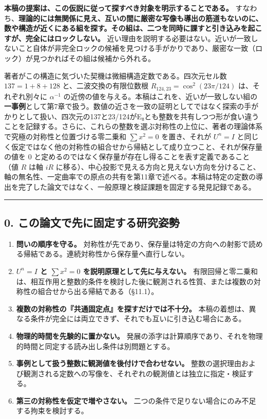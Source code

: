 \documentclass[
  a4paper,
]{ltjsarticle}
\providecommand{\tightlist}{%
  \setlength{\itemsep}{0pt}\setlength{\parskip}{0pt}}
\begin{document}
\textbf{本稿の提案は、この仮説に従って探すべき対象を明示することである。}
すなわち、\textbf{理論的には無関係に見え、互いの間に厳密な写像も導出の筋道もないのに、数や構造が近くにある組を探す。その組は、二つを同時に課すと引き込みを起こすが、完全にはロックしない。}
近い理由を説明する必要はない。近いが一致しないこと自体が非完全ロックの候補を見つける手がかりであり、厳密な一致（ロック）が見つかればその組は候補から外れる。

著者がこの構造に気づいた契機は微細構造定数である。四次元セル数
\(137=1+8+128\) と、二波交換の有限位数根
\(R_{124,23}=\cos^2(23\pi/124)\) は、それぞれ別々に \(\alpha^{-1}\)
の近傍の値を与える。本稿はこれを、近いが一致しない組の\textbf{一事例}として第7章で扱う。数値の近さを一致の証明としてではなく探索の手がかりとして扱い、四次元の137と23/124がE₈とも整数を共有しつつ形が食い違うことを記録する。さらに、これらの整数を選ぶ対称性の上位に、著者の理論体系で究極の対称性と位置づける零二乗和
\(\sum x^2=0\) を置き、それが \(U^n=I\)
と同じく仮定ではなく他の対称性の組合せから帰結として成り立つこと、それが保存量の値を
0 と定めるのではなく保存量が存在し得ることを表す定義であること（値 \(R\)
は軸 \(iR\)
に移る）、中心投影で見える方向と見えない方向を分けること、軸の無名性、一定曲率での原点の共有を第11章で述べる。本稿は特定の定数の導出を完了した論文ではなく、一般原理と検証課題を固定する発見記録である。

\begin{center}\rule{0.5\linewidth}{0.5pt}\end{center}

\subsection{0.
この論文で先に固定する研究姿勢}\label{ux3053ux306eux8ad6ux6587ux3067ux5148ux306bux56faux5b9aux3059ux308bux7814ux7a76ux59ffux52e2}

\begin{enumerate}
\def\labelenumi{\arabic{enumi}.}
\tightlist
\item
  \textbf{問いの順序を守る。}
  対称性が先であり、保存量は特定の方向への射影で読める帰結である。連続対称性から保存量へ直行しない。
\item
  \textbf{\(U^n=I\) と \(\sum x^2=0\) を説明原理として先に与えない。}
  有限回帰と零二乗和は、相互作用と整数的条件を検討した後に観測される性質、または複数の対称性の組合せから出る帰結である（§11.1）。
\item
  \textbf{複数の対称性の『共通固定点』を探すだけでは不十分。}
  本稿の着想は、異なる条件が完全には両立できず、それでも互いに引き込む場合にある。
\item
  \textbf{物理的時間を先験的に置かない。}
  発展の添字は計算順序であり、それを物理的時間と同定する読み出し条件は別問題とする。
\item
  \textbf{事例として扱う整数に観測値を後付けで合わせない。}
  整数の選択理由および観測される定数への写像を、それぞれの観測値とは独立に指定・検証する。
\item
  \textbf{第三の対称性を仮定で増やさない。}
  二つの条件で足りない場合にのみ不足する拘束を検討する。
\end{enumerate}
\end{document}
